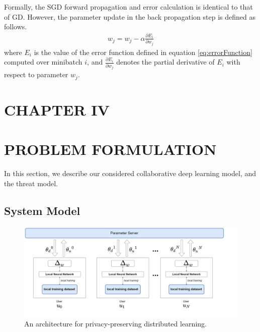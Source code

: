 \documentclass[letterpaper]{article}
\begin{document}
\begin{flushleft}
{%
Formally, the SGD forward propagation and error calculation is identical to that of GD. However, the parameter update in the 
back propagation step is defined as follows.
\begin{align}\label{eq:SGD}
w_j = w_j -\alpha \frac{\partial E_i}{\partial w_j}
\end{align}
where $E_i$ is the value of the error function defined in equation \eqref{eq:errorFunction} computed over
minibatch $i$, and  $\frac{\partial E_i}{\partial w_j}$ denotes the partial derivative of $E_i$ with respect to parameter $w_j$. 

\pagebreak
\section*{CHAPTER IV}
\vspace{0.25in}
\section{PROBLEM FORMULATION}

In this section, we describe our considered collaborative deep learning model, and the threat model. 

\subsection{System Model} \label{sec:systemModel}

\begin{figure}[H]
  \centering
    \includegraphics[width=7in]{HighLevelArch.png}
    \caption[Privacy preserving architecture]{\label{fig:HighLevel} An architecture for privacy-preserving distributed learning.}
  \end{figure}

}
\end{flushleft}
\end{document}
